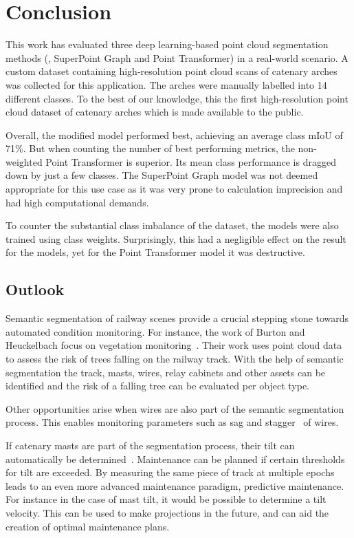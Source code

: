 \section{Conclusion} \label{sec:semseg:conclusion}
This work has evaluated three deep learning-based point cloud segmentation methods (\pnpp{}, SuperPoint Graph and Point Transformer) in a real-world scenario. 
A custom dataset containing high-resolution point cloud scans of catenary arches was collected for this application. The arches were manually labelled into 14 different classes. To the best of our knowledge, this the first high-resolution point cloud dataset of catenary arches which is made available to the public.

Overall, the modified \pnpp{} model performed best, achieving an average class mIoU of 71\%. But when counting the number of best performing metrics, the non-weighted Point Transformer is superior. Its mean class performance is dragged down by just a few classes. The SuperPoint Graph model was not deemed appropriate for this use case as it was very prone to calculation imprecision and had high computational demands.

To counter the substantial class imbalance of the dataset, the models were also trained using class weights. Surprisingly, this had a negligible effect on the result for the \pnpp{} models, yet for the Point Transformer model it was destructive.

\subsection{Outlook}
Semantic segmentation of railway scenes provide a crucial stepping stone towards automated condition monitoring. For instance, the work of Burton and Heuckelbach focus on vegetation monitoring~\cite{burton20}. Their work uses point cloud data to assess the risk of trees falling on the railway track. With the help of semantic segmentation the track, masts, wires, relay cabinets and other assets can be identified and the risk of a falling tree can be evaluated per object type.

Other opportunities arise when wires are also part of the semantic segmentation process. This enables monitoring parameters such as sag and stagger~\cite{gutirrezfernndez2020automatic, zhang22} of wires.

If catenary masts are part of the segmentation process, their tilt can automatically be determined~\cite{marwati2021automatic}. Maintenance can be planned if certain thresholds for tilt are exceeded. By measuring the same piece of track at multiple epochs leads to an even more advanced maintenance paradigm, predictive maintenance. For instance in the case of mast tilt, it would be possible to determine a tilt velocity. This can be used to make projections in the future, and can aid the creation of optimal maintenance plans.

